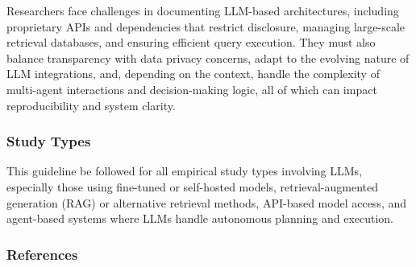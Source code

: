 Researchers face challenges in documenting LLM-based architectures, including proprietary APIs and dependencies that restrict disclosure, managing large-scale retrieval databases, and ensuring efficient query execution. They must also balance transparency with data privacy concerns, adapt to the evolving nature of LLM integrations, and, depending on the context, handle the complexity of multi-agent interactions and decision-making logic, all of which can impact reproducibility and system clarity.

\subsubsection{Study Types}

This guideline \must be followed for all empirical study types involving LLMs, especially those using fine-tuned or self-hosted models, retrieval-augmented generation (RAG) or alternative retrieval methods, API-based model access, and agent-based systems where LLMs handle autonomous planning and execution.

\subsubsection{References}





